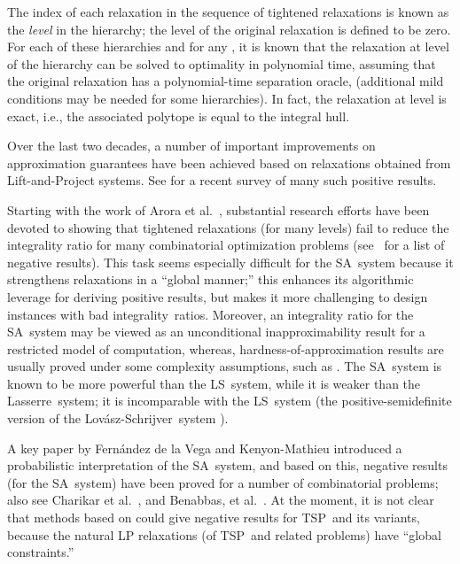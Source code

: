 \documentclass[11pt]{article}
\newcommand{\ls}{\textsf{Lov\'asz-Schrijver}}
\newcommand{\la}{\textsf{Lasserre}}
\newcommand{\iLS}{\textsf{LS}}
\newcommand{\iLSp}{\textsf{LS}}
\newcommand{\iSA}{\textsf{SA}}
\newcommand{\tsp}{\textsc{TSP}}
\renewcommand{\P}{}
\newcommand{\NP}{}
\begin{document}
The index of each relaxation in the sequence of tightened relaxations
is known as the \textit{level} in the hierarchy; the level of the
original relaxation is defined to be zero.
For each of these hierarchies and for any ,
it is known that
the relaxation at level  of
the hierarchy can be solved to optimality in polynomial time,
assuming that the original relaxation has
a polynomial-time separation oracle,
\cite{tourlakisthesis06}
(additional mild conditions may be needed for some hierarchies).
In fact, the relaxation at level  is exact, i.e.,
the associated polytope is equal to the integral hull.


Over the last two decades,
a number of important improvements on approximation guarantees have
been achieved based on relaxations obtained from Lift-and-Project
systems.
See \cite{CM-chapter} for a recent survey of many such positive results.


Starting with the work of Arora et al.~\cite{ABLT06},
substantial research efforts have been devoted to
showing that tightened relaxations (for many levels) fail to reduce
the integrality ratio for many combinatorial optimization problems
(see~\cite{CM-chapter} for a list of negative results).
This task seems especially difficult for
the \iSA\ system because it strengthens
relaxations in a ``global manner;''
this enhances its algorithmic leverage for deriving positive results,
but makes it more challenging
to design instances with bad integrality~ratios.
Moreover, an integrality ratio for the \iSA\ system may be viewed as an
unconditional inapproximability result for a restricted model of
computation, whereas, hardness-of-approximation results are usually
proved under some complexity assumptions, such as {\P}{\NP}.
The \iSA\ system is known to be more powerful than
the \iLS\ system, while it is weaker than the \la\ system;
it is incomparable with the \iLSp\ system
(the positive-semidefinite version of the \ls\ system \cite{LS91}).



A key paper by Fern\'andez de la Vega and Kenyon-Mathieu \cite{FK07}
introduced a probabilistic interpretation of the \iSA\ system, and
based on this, negative results (for the \iSA\ system) have been proved
for a number of combinatorial problems;
also see
Charikar et al.~\cite{CMM09}, and Benabbas, et al.~\cite{BCGM11}.
At the moment, it is not clear that methods based on \cite{FK07} could
give negative results for \tsp\ and its variants, because the natural
LP relaxations (of \tsp\ and related problems) have ``global
constraints.''
\end{document}
